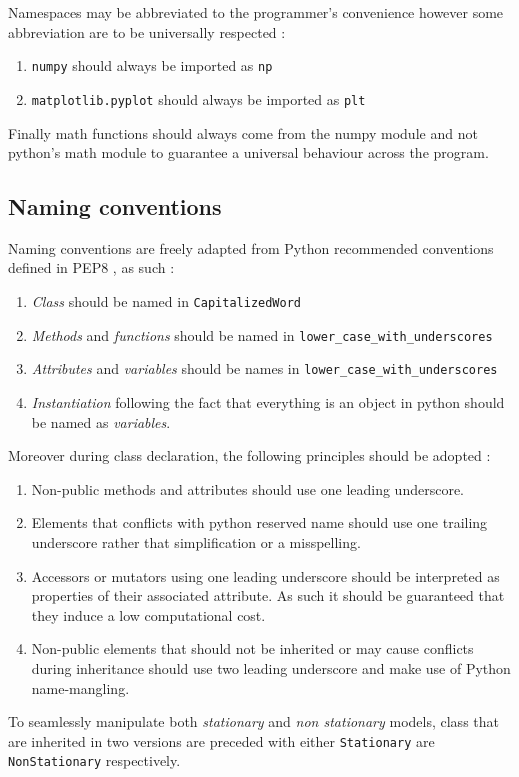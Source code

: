 \documentclass[]{article}
\begin{document}
Namespaces may be abbreviated to the programmer's convenience however some abbreviation are to be universally respected :
\begin{enumerate}[label=(\roman*)]
	\item \texttt{numpy} should always be imported as \texttt{np}
	\item \texttt{matplotlib.pyplot} should always be imported as \texttt{plt}
\end{enumerate}

Finally math functions should always come from the numpy module and not python's math module to guarantee a universal behaviour across the program.

\subsection{Naming conventions}\label{sec:naming-conventions}

Naming conventions are freely adapted from Python recommended conventions defined in PEP8 \cite{pep8}, as such :
\begin{enumerate}[label=(\roman*)]
	\item \emph{Class} should be named in \texttt{CapitalizedWord}
	\item \emph{Methods} and \emph{functions} should be named in \texttt{lower\_case\_with\_underscores}
	\item \emph{Attributes} and \emph{variables} should be names in \texttt{lower\_case\_with\_underscores}
	\item \emph{Instantiation} following the fact that everything is an object in python should be named as \emph{variables}.
\end{enumerate}
Moreover during class declaration, the following principles should be adopted :
\begin{enumerate}[label=(\roman*)]
	\item Non-public methods and attributes should use one leading underscore.
	\item Elements that conflicts with python reserved name should use one trailing underscore rather that simplification or a misspelling.
	\item Accessors or mutators using one leading underscore should be interpreted as properties of their associated attribute. As such it should be guaranteed that they induce a low computational cost.
	\item Non-public elements that should not be inherited or may cause conflicts during inheritance should use two leading underscore and make use of Python name-mangling.
\end{enumerate}
To seamlessly manipulate both \emph{stationary} and \emph{non stationary} models, class that are inherited in two versions are preceded with either \texttt{Stationary} are \texttt{NonStationary} respectively.
\end{document}
